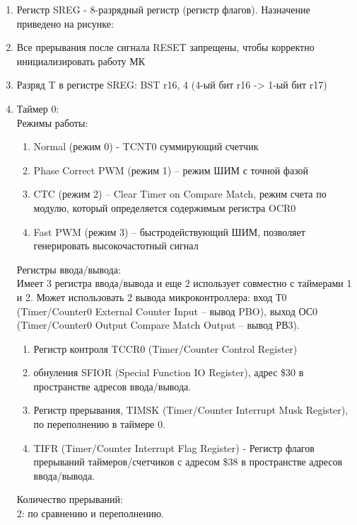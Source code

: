 \documentclass{article}
\begin{document}
\begin{enumerate}
		\item Регистр SREG - 8-разрядный регистр (регистр флагов). Назначение приведено на рисунке:
		\begin{figure}[h!]
		\end{figure}
\newpage
		\item Все прерывания после сигнала RESET запрещены, чтобы корректно инициализировать работу МК
		\item Разряд T в регистре SREG: BST r16, 4 (4-ый бит r16 -> 1-ый бит r17)
		\item Таймер 0:\\ Режимы работы:
			\begin{enumerate}
				\item Normal (режим 0) - TCNT0 суммирующий счетчик
				\item Phase Correct PWM (режим 1) – режим ШИМ с точной фазой
				\item  CTC (режим 2) – Clear Timer on Compare Match, режим счета по модулю, который определяется содержимым регистра OCR0 
				\item Fast PWM (режим 3) – быстродействующий ШИМ, позволяет генерировать высокочастотный сигнал
			\end{enumerate}
			Регистры ввода/вывода:\\
			Имеет 3 регистра ввода/вывода и еще 2 использует совместно с таймерами 1 и 2. Может использовать 2 вывода микроконтроллера: вход Т0 (Timer/Counter0 External Counter Input – вывод PBO), выход ОС0 (Timer/Counter0 Output Compare Match Output – вывод РВ3). 
			\begin{enumerate}
				\item Регистр контроля TCCR0 (Timer/Counter Control Register)
				\item обнуления SFIOR (Special Function IO Register), адрес \$30 в пространстве адресов ввода/вывода.
				\item Регистр прерывания, TIMSK (Timer/Counter Interrupt Musk Register), по переполнению в таймере 0.
				\item TIFR (Timer/Counter Interrupt Flag Register) - Регистр флагов прерываний таймеров/счетчиков  с адресом \$38 в пространстве адресов ввода/вывода.
			\end{enumerate}
			Количество прерываний: \\
2: по  сравнению и переполнению. 
			\begin{figure}[h!]
			\end{figure}

\end{enumerate}
\end{document}
